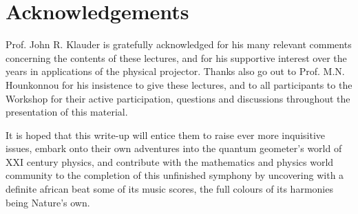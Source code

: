 \documentclass[a4paper,11pt]{article}
\begin{document}
\section*{Acknowledgements}

Prof. John R. Klauder is gratefully acknowledged for his many relevant
comments concerning the contents of these lectures, and for his supportive
interest over the years in applications of the physical projector. Thanks 
also go out to Prof. M.N. Hounkonnou for his insistence to give these
lectures, and to all participants to the Workshop for their active 
participation, questions and discussions throughout the presentation of 
this material. 

It is hoped that this write-up will entice them to raise ever 
more in\-qui\-si\-ti\-ve issues, embark onto their own adventures into the 
quantum geometer's world of XXI\coordHE{} century physics, and 
contribute with the mathematics and physics world community to the
completion of this unfinished symphony by uncovering with a definite african
beat some of its music scores, the full colours of its harmonies 
being Nature's own.

\clearpage
\end{document}
